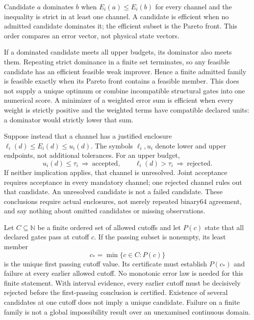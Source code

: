 \begin{definition}
Candidate $a$ dominates $b$ when $E_i(a)\leq E_i(b)$ for every channel and
the inequality is strict in at least one channel. A candidate is efficient
when no admitted candidate dominates it; the efficient subset is the Pareto
front. This order compares an error vector, not physical state vectors.
\end{definition}
If a dominated candidate meets all upper budgets, its dominator also meets
them. Repeating strict dominance in a finite set terminates, so any feasible
candidate has an efficient feasible weak improver. Hence a finite admitted
family is feasible exactly when its Pareto front contains a feasible member.
This does not supply a unique optimum or combine incompatible structural
gates into one numerical score. A minimizer of a weighted error sum is
efficient when every weight is strictly positive and the weighted terms have
compatible declared units: a dominator would strictly lower that sum.

Suppose instead that a channel has a justified enclosure
$\ell_i(d)\leq E_i(d)\leq u_i(d)$. The symbols $\ell_i,u_i$ denote lower
and upper endpoints, not additional tolerances. For an upper budget,
\begin{equation}
  u_i(d)\leq\tau_i\ \Longrightarrow\ \text{accepted},\qquad
  \ell_i(d)>\tau_i\ \Longrightarrow\ \text{rejected}.
  \label{eq:auxiliary-interval-decisions}
\end{equation}
If neither implication applies, that channel is unresolved. Joint acceptance
requires acceptance in every mandatory channel; one rejected channel rules
out that candidate. An unresolved candidate is not a failed candidate.
These conclusions require actual enclosures, not merely repeated binary64
agreement, and say nothing about omitted candidates or missing observations.

Let $C\subseteq\mathbb N$ be a finite ordered set of allowed cutoffs and
let $P(c)$ state that all declared gates pass at cutoff $c$. If the passing
subset is nonempty, its least member
\begin{equation}
  c_* = \min\{c\in C:P(c)\}
  \label{eq:auxiliary-first-passing-cutoff}
\end{equation}
is the unique first passing cutoff value. Its certificate must establish
$P(c_*)$ and failure at every earlier allowed cutoff. No monotonic error
law is needed for this finite statement. With interval evidence, every earlier
cutoff must be decisively rejected before the first-passing conclusion is
certified. Existence of several candidates at one cutoff does not imply a
unique candidate. Failure on a finite family is not a global impossibility
result over an unexamined continuous domain.


